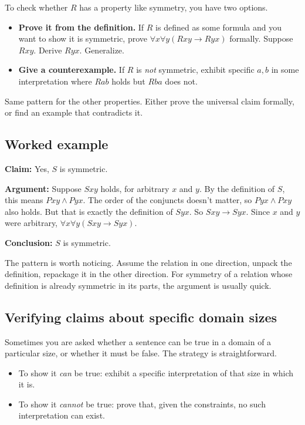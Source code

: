 \documentclass[11pt]{article}
\begin{document}
To check whether $R$ has a property like symmetry, you have two options.

\begin{itemize}[leftmargin=*]
    \item \textbf{Prove it from the definition.} If $R$ is defined as some formula and you want to show it is symmetric, prove $\forall x \forall y(Rxy \to Ryx)$ formally. Suppose $Rxy$. Derive $Ryx$. Generalize.
    \item \textbf{Give a counterexample.} If $R$ is \emph{not} symmetric, exhibit specific $a, b$ in some interpretation where $Rab$ holds but $Rba$ does not.
\end{itemize}

Same pattern for the other properties. Either prove the universal claim formally, or find an example that contradicts it.

\subsection{Worked example}

\begin{example}
\textbf{Claim:} Yes, $S$ is symmetric.

\textbf{Argument:} Suppose $Sxy$ holds, for arbitrary $x$ and $y$. By the definition of $S$, this means $Pxy \wedge Pyx$. The order of the conjuncts doesn't matter, so $Pyx \wedge Pxy$ also holds. But that is exactly the definition of $Syx$. So $Sxy \to Syx$. Since $x$ and $y$ were arbitrary, $\forall x \forall y(Sxy \to Syx)$.

\textbf{Conclusion:} $S$ is symmetric.
\end{example}

The pattern is worth noticing. Assume the relation in one direction, unpack the definition, repackage it in the other direction. For symmetry of a relation whose definition is already symmetric in its parts, the argument is usually quick.

\subsection{Verifying claims about specific domain sizes}

Sometimes you are asked whether a sentence can be true in a domain of a particular size, or whether it must be false. The strategy is straightforward.

\begin{itemize}[leftmargin=*]
    \item To show it \emph{can} be true: exhibit a specific interpretation of that size in which it is.
    \item To show it \emph{cannot} be true: prove that, given the constraints, no such interpretation can exist.
\end{itemize}
\end{document}
